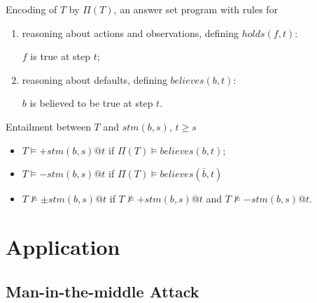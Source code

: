 \documentclass[unknownkeysallowed]{beamer}
\begin{document}
\begin{frame}{}


Encoding of $T$ by $\Pi(T)$, an answer set program with rules for    
\begin{enumerate}
\item reasoning about actions and observations, defining $holds(f, t)$: 

$f$ is true at step $t$; 
 
\item reasoning about defaults, defining $believes(b,t)$: 

$b$ is believed to be true at step $t$. 
\end{enumerate} 

\begin{block}{Entailment between $T$ and $stm(b,s)$, $t \ge s$}
\begin{itemize} 
\item $T \models {+}stm(b,s)@t$  if  $\Pi(T) \models believes(b,t) $; 

\item $T \models {-}stm(b,s)@t$  if $\Pi(T) \models believes(\overline{b},t)$  

\item $T \not\models {\pm}stm(b,s)@t$     
if $T \not\models +stm(b,s)@t$ and $T \not\models -stm(b,s)@t$.

\end{itemize}  
\end{block} 



\end{frame}

\section{Application}

\subsection*{Man-in-the-middle Attack} 
\end{document}
